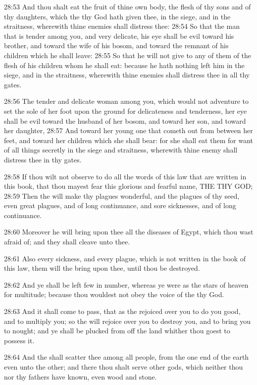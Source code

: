 28:53 And thou shalt eat the fruit of thine own body, the flesh of thy sons and of thy daughters, which the \LORD thy God hath given thee, in the siege, and in the straitness, wherewith thine enemies shall distress thee: 28:54 So that the man that is tender among you, and very delicate, his eye shall be evil toward his brother, and toward the wife of his bosom, and toward the remnant of his children which he shall leave: 28:55 So that he will not give to any of them of the flesh of his children whom he shall eat: because he hath nothing left him in the siege, and in the straitness, wherewith thine enemies shall distress thee in all thy gates.

28:56 The tender and delicate woman among you, which would not adventure to set the sole of her foot upon the ground for delicateness and tenderness, her eye shall be evil toward the husband of her bosom, and toward her son, and toward her daughter, 28:57 And toward her young one that cometh out from between her feet, and toward her children which she shall bear: for she shall eat them for want of all things secretly in the siege and straitness, wherewith thine enemy shall distress thee in thy gates.

28:58 If thou wilt not observe to do all the words of this law that are written in this book, that thou mayest fear this glorious and fearful name, THE \LORD THY GOD; 28:59 Then the \LORD will make thy plagues wonderful, and the plagues of thy seed, even great plagues, and of long continuance, and sore sicknesses, and of long continuance.

28:60 Moreover he will bring upon thee all the diseases of Egypt, which thou wast afraid of; and they shall cleave unto thee.

28:61 Also every sickness, and every plague, which is not written in the book of this law, them will the \LORD bring upon thee, until thou be destroyed.

28:62 And ye shall be left few in number, whereas ye were as the stars of heaven for multitude; because thou wouldest not obey the voice of the \LORD thy God.

28:63 And it shall come to pass, that as the \LORD rejoiced over you to do you good, and to multiply you; so the \LORD will rejoice over you to destroy you, and to bring you to nought; and ye shall be plucked from off the land whither thou goest to possess it.

28:64 And the \LORD shall scatter thee among all people, from the one end of the earth even unto the other; and there thou shalt serve other gods, which neither thou nor thy fathers have known, even wood and stone.

